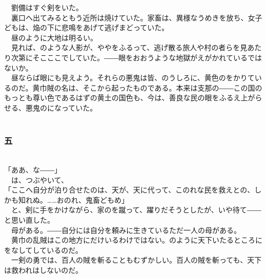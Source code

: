 \documentclass[
  paper=a5,
  fontsize=10pt,
  jafontsize=9.5pt,
  tate,                  %
  open_bracket_pos=nibu, %
]{jlreq}
\begin{document}
　劉備はすぐ剣をいた。\\


　裏口へ出てみるともう近所は焼けていた。家畜は、異様なうめきを放ち、女子どもは、焔の下に悲鳴をあげて逃げまどっていた。\\


　昼のように大地は明るい。\\


　見れば、のような人影が、ややをふるって、逃げ散る旅人や村の者らを見あたり次第にそこここでしていた。――眼をおおうような地獄がえがかれているではないか。\\


　昼ならば眼にも見えよう。それらの悪鬼は皆、のうしろに、黄色のをかりているのだ。黄巾賊の名は、そこから起ったものである。本来は支那の――この国のもっとも尊い色であるはずの黄土の国色も、今は、善良な民の眼をふるえ上がらせる、悪鬼のになっていた。\\

\\

\subsubsection{五}

\\


「ああ、な――」\\


　は、つぶやいて、\\


「ここへ自分が泊り合せたのは、天が、天に代って、このれな民を救えとの、しかも知れぬ。……おのれ、鬼畜どもめ」\\


　と、剣に手をかけながら、家のを蹴って、躍りだそうとしたが、いや待て――と思い直した。\\


　母がある。――自分には自分を頼みに生きているただ一人の母がある。\\


　黄巾の乱賊はこの地方にだけいるわけではない。のように天下いたるところにをなしてしているのだ。\\


　一剣の勇では、百人の賊を斬ることもむずかしい。百人の賊を斬っても、天下は救われはしないのだ。\\
\end{document}
